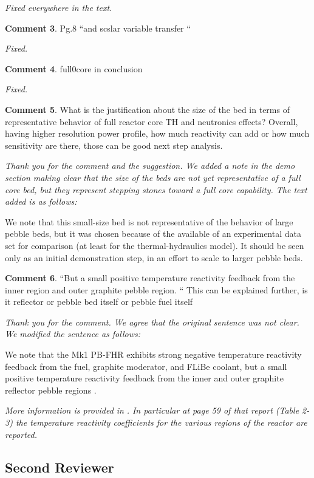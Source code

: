 \documentclass{nseJournal}
\begin{document}
\textit{Fixed everywhere in the text.}

\textbf{Comment 3}. Pg.8 “and scslar variable transfer “

\textit{Fixed.}

\textbf{Comment 4}. full0core in conclusion

\textit{Fixed.}

\textbf{Comment 5}. What is the justification about the size of the bed in terms of representative behavior of full reactor core TH and neutronics effects? Overall, having higher resolution power profile, how
much reactivity can add or how much sensitivity are there, those can be good next step
analysis.

\textit{Thank you for the comment and the suggestion. We added a note in the demo section making clear that the size of the beds are not yet representative of a full core bed, but they represent stepping stones toward a full core capability. The text added is as follows: }

We note that this small-size bed is not representative of the behavior of large pebble beds,
but it was chosen because of the available of an experimental data set for comparison (at least for the thermal-hydraulics model). It should be seen only as an initial demonstration step, in an effort to scale to larger pebble beds.

\textbf{Comment 6}. “But a small positive temperature reactivity feedback from the inner region and outer graphite pebble region. “ This can be explained further, is it reflector or pebble bed itself or pebble fuel itself

\textit{Thank you for the comment. We agree that the original sentence was not clear. We modified the sentence as follows:}

We note that the Mk1 PB-FHR exhibits strong negative temperature reactivity feedback from the fuel, graphite moderator, and FLiBe coolant, but a small positive temperature reactivity feedback from the inner  and outer graphite reflector pebble regions \cite{cisneros2014technical}.

\textit{More information is provided in } \cite{cisneros2014technical} \textit{. In particular at page 59 of that report (Table 2-3) the temperature reactivity coefficients for the various regions of the reactor are reported.}

\subsection*{Second Reviewer}
\end{document}
